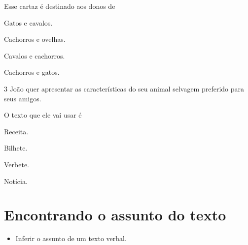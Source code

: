 Esse cartaz é destinado aos donos de 

\begin{escolha}
	\item Gatos e cavalos.

	\item Cachorros e ovelhas.

	\item Cavalos e cachorros.

	\item Cachorros e gatos.
\end{escolha}

\num{3} João quer apresentar as características do seu animal selvagem
preferido para seus amigos.

O texto que ele vai usar é

\begin{escolha}
	\item Receita.

	\item Bilhete.

	\item Verbete.

	\item Notícia.
\end{escolha}

\chapter{Encontrando o assunto do texto}


\begin{itemize}
\item Inferir o assunto de um texto verbal.
\end{itemize}


